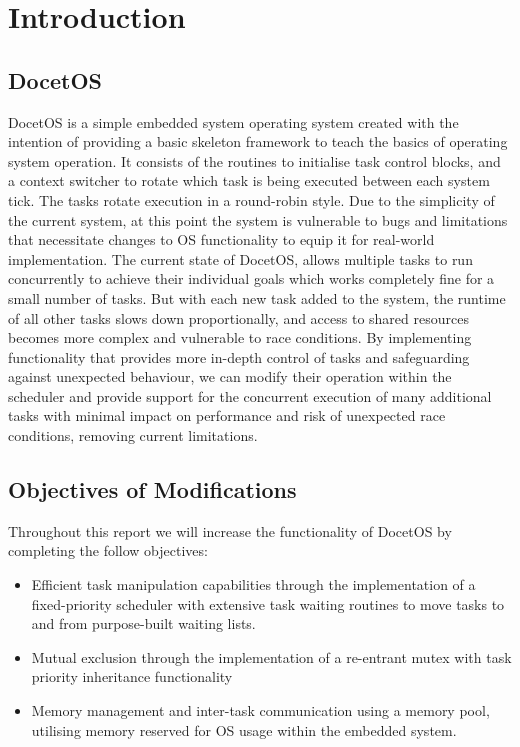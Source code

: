 \section{Introduction}
\subsection{DocetOS}
DocetOS is a simple embedded system operating system created with the intention of providing a basic skeleton framework to teach the basics of operating system operation. It consists of the routines to initialise task control blocks, and a context switcher to rotate which task is being executed between each system tick. The tasks rotate execution in a round-robin style. Due to the simplicity of the current system, at this point the system is vulnerable to bugs and limitations that necessitate changes to OS functionality to equip it for real-world implementation.\hfill\newline
The current state of DocetOS, allows multiple tasks to run concurrently to achieve their individual goals which works completely fine for a small number of tasks. But with each new task added to the system, the runtime of all other tasks slows down proportionally, and access to shared resources becomes more complex and vulnerable to race conditions. By implementing functionality that provides more in-depth control of tasks and safeguarding against unexpected behaviour, we can modify their operation within the scheduler and provide support for the concurrent execution of many additional tasks with minimal impact on performance and risk of unexpected race conditions, removing current limitations.

\subsection{Objectives of Modifications}
Throughout this report we will increase the functionality of DocetOS by completing the follow objectives:
\begin{itemize}
	\item	Efficient task manipulation capabilities through the implementation of a fixed-priority scheduler with extensive task waiting routines to move tasks to and from purpose-built waiting lists.
	\item	Mutual exclusion through the implementation of a re-entrant mutex with task priority inheritance functionality
	\item	Memory management and inter-task communication using a memory pool, utilising memory reserved for OS usage within the embedded system.

\end{itemize}

